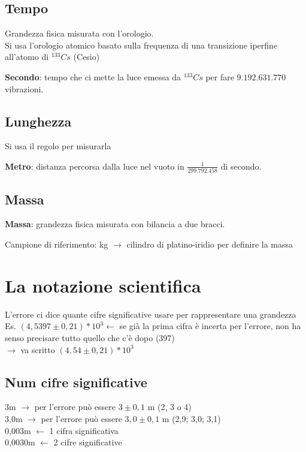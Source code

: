 \documentclass{report}
\begin{document}
\subsection{Tempo}
Grandezza fisica misurata con l'orologio.\\
Si usa l'orologio atomico basato sulla frequenza di una transizione iperfine all'atomo di $^{133}Cs$ (Cesio)
\begin{definition}
  \textbf{Secondo}: tempo che ci mette la luce emessa da $^{133}Cs$ per fare $9.192.631.770$ vibrazioni.
\end{definition}
\subsection{Lunghezza}
Si usa il regolo per misurarla
\begin{definition}
  \textbf{Metro}: distanza percorsa dalla luce nel vuoto in $\frac{1}{299.792.458}$ di secondo.
\end{definition}
\subsection{Massa}
\begin{definition}
  \textbf{Massa}: grandezza fisica misurata con bilancia a due bracci.
\end{definition}
Campione di riferimento: kg $\rightarrow$ cilindro di platino-iridio per definire la massa
\section{La notazione scientifica}
L'errore ci dice quante cifre significative usare per rappresentare una grandezza\\
Es. $(4,5397\pm0,21)*10^{3} \leftarrow$ se già la prima cifra è incerta per l'errore, non ha senso precisare tutto quello che c'è dopo (397)
\\
$\rightarrow$ va scritto $(4,54\pm0,21)*10^{3}$
\subsection{Num cifre significative}
3m $\rightarrow$ per l'errore può essere $3\pm0,1$ m (2, 3 o 4)\\
3,0m $\rightarrow$ per l'errore può essere $3,0\pm0,1$ m (2,9; 3,0; 3,1)\\
0,003m $\leftarrow$ 1 cifra significativa\\
0,0030m $\leftarrow$ 2 cifre significative\\
\end{document}
